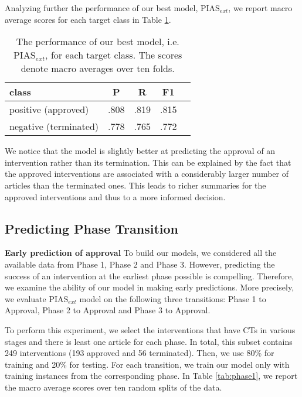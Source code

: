 \documentclass[11pt]{article}
\begin{document}
Analyzing further the performance of our best model, PIAS$_{ext}$, we report macro average scores for each target class in Table \ref{tab:class}.
\begin{table}[htp]
\centering
\begin{tabular}{lcccc}
\hline
\textbf{class} &\textbf{P} & \textbf{R} & \textbf{F1}\\
\hline
positive (approved) & .808 & .819 & .815 \\ 
negative (terminated) & .778 & .765 & .772 \\ 
\hline
\end{tabular}

\caption{The performance of our best model, i.e. PIAS$_{ext}$,  for each target class. The scores denote macro averages over ten folds.}
\label{tab:class}
\end{table}
We notice that the model is slightly better at predicting the approval of an intervention rather than its termination. 
This can be explained by the fact that the approved interventions are associated with a considerably larger number of articles than the terminated ones. This leads to richer summaries for the approved interventions and thus to a more informed decision.


\subsection{Predicting Phase Transition}

\textbf{Early prediction of approval} To build our models, we considered all the available data from Phase 1, Phase 2 and Phase 3. However, predicting the success of an intervention at the earliest phase possible is compelling. Therefore, we examine the ability of our model in making early predictions. More precisely, we evaluate PIAS$_{ext}$ model on the following three transitions: Phase 1 to Approval, Phase 2 to Approval and Phase 3 to Approval. 

To perform this experiment, we select the interventions that have CTs in various stages and there is least one article for each phase. 
In total, this subset contains 249 interventions (193 approved and 56 terminated). Then, we use 80\% for  training and 20\% for testing. For each transition, we train our model only with training instances from the corresponding phase. In Table \ref{tab:phase1}, we report the macro average scores over ten random splits of the data.  
\end{document}
